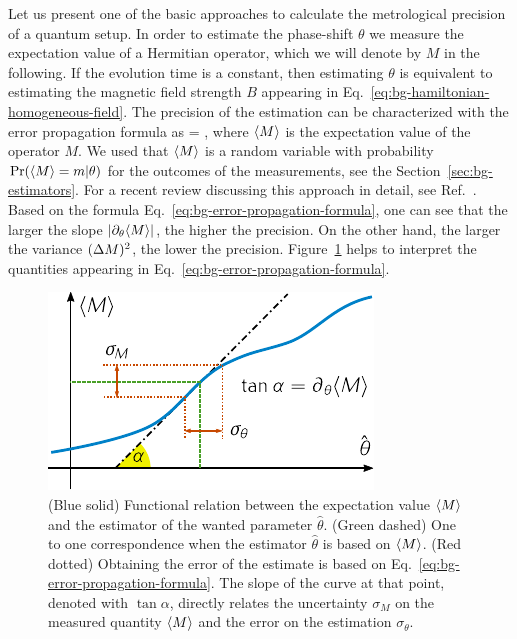 Let us present one of the basic approaches to calculate the metrological precision of a quantum setup.
In order to estimate the phase-shift $\theta$ we measure the expectation value of a Hermitian operator, which we will denote by $M$ in the following.
If the evolution time is a constant, then estimating $\theta$ is equivalent to estimating the magnetic field strength $B$ appearing in Eq.~\eqref{eq:bg-hamiltonian-homogeneous-field}.
The precision of the estimation can be characterized with the error propagation formula as
\be
  \label{eq:bg-error-propagation-formula}
  \varian{\theta} = ,
\ee
where $\langle{M}\rangle$ is the expectation value of the operator $M$.
We used that $\langle{M}\rangle$ is a random variable with probability $\text{Pr}(\langle{M}\rangle=m|\theta)$ for the outcomes of the measurements, see the Section~\ref{sec:bg-estimators}.
For a recent review discussing this approach in detail, see Ref.~\cite{Kolodynski2010}.
Based on the formula Eq.~\eqref{eq:bg-error-propagation-formula}, one can see that the larger the slope $|\partial_\theta \langle{M}\rangle|$, the higher the precision.
On the other hand, the larger the variance $(\Delta M )^2$, the lower the precision.
Figure~\ref{fig:bg-expect-m-evo} helps to interpret the quantities appearing in Eq.~\eqref{eq:bg-error-propagation-formula}.
\begin{figure}[htp]
  \centering
  \includegraphics[scale=1.2]{img/BG_expect_m_evo.pdf}
  \caption[Error-propagation formula]{
  (Blue solid) Functional relation between the expectation value $\langle{M}\rangle$ and the estimator of the wanted parameter $\hat\theta$.
  (Green dashed) One to one correspondence when the estimator $\hat{\theta}$ is based on $\langle{M}\rangle$. (Red dotted) Obtaining the error of the estimate is based on Eq.~\eqref{eq:bg-error-propagation-formula}.
  The slope of the curve at that point, denoted with $\tan\alpha$, directly relates the uncertainty $\sigma_M$ on the measured quantity $\langle{M}\rangle$ and the error on the estimation $\sigma_\theta$.}
  \label{fig:bg-expect-m-evo}
\end{figure}

